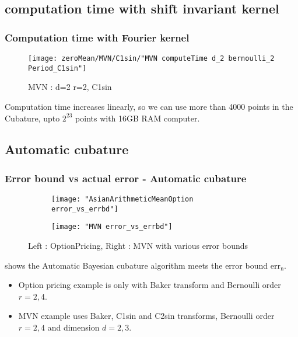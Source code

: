 \documentclass[10pt,compress,xcolor={usenames,dvipsnames}]{beamer} %
\newcommand{\errn}{{\text{err}}_{\text{n}}}
\begin{document}
\subsection{computation time with shift invariant kernel}
\begin{frame}
\frametitle{Computation time with Fourier kernel}
\vspace{-1ex}
\begin{figure}[htp]
\captionsetup[subfigure]{labelformat=empty}
\centering
\texttt{[image: zeroMean/MVN/C1sin/"MVN computeTime d\_2 bernoulli\_2 Period\_C1sin"]}
\caption{ MVN : d=2 r=2, C1sin }
\end{figure}
\vspace{-3ex}
Computation time increases linearly, so we can use more than 4000 points in the Cubature, upto $2^{23}$ points with 16GB RAM computer.
\end{frame}











\subsection{Automatic cubature}






\begin{frame}
\frametitle{Error bound vs actual error - Automatic cubature}
\vspace{-5ex}
\begin{figure}[htp]
\captionsetup[subfigure]{labelformat=empty}
\centering
\begin{subfigure}[b]{0.49\textwidth}
\texttt{[image: "AsianArithmeticMeanOption error\_vs\_errbd"]}
\end{subfigure}
\centering
\begin{subfigure}[b]{0.49\textwidth}
\texttt{[image: "MVN error\_vs\_errbd"]}
\end{subfigure}
\caption{ Left : OptionPricing, Right : MVN with various error bounds}
\end{figure}
\vspace{-3ex}
shows the Automatic Bayesian cubature algorithm meets the error bound $\errn$.
\vspace{-3ex}
\begin{itemize}
\item
Option pricing example is only with Baker transform and Bernoulli order $r=2,4$.
\item
MVN example uses Baker, C1sin and C2sin transforms, Bernoulli order $r=2,4$ and dimension $d=2,3$.
\end{itemize}
\end{frame}
\end{document}
